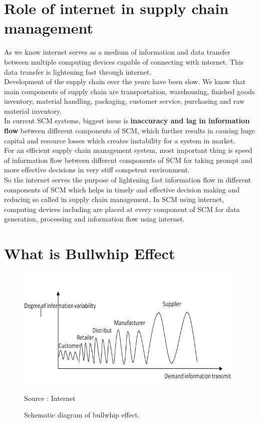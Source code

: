 \documentclass[12pt, a4paper]{report}
\begin{document}
\section{Role of internet in supply chain management}
As we know internet serves as a medium of information and data transfer between multiple computing devices capable of connecting with internet. This data transfer is lightening fast through internet.\\
Development of the supply chain over the years have been slow. We know that main components of supply chain are transportation, warehousing, finished goods inventory, material handling, packaging, customer service, purchasing and raw material inventory.\\
In current SCM systems, biggest issue is \textbf{inaccuracy and lag in information flow} between different components of SCM, which further results in  causing huge capital and resource losses which creates instability for a system in market.\\
For an efficient supply chain management system, most important thing is speed of information flow between different components of SCM for taking prompt and more effective decisions in very stiff competent environment.\\
So the internet serves the purpose of lightening fast information flow in different components of SCM which helps in timely and effective decision making and reducing so called  in supply chain management. In SCM using internet, computing devices including  are placed at every component of SCM for data generation, processing and information flow using internet.\cite{lancioni2000role}
\section{What is Bullwhip Effect}
\begin{figure}[h]
\centering
\includegraphics[width=11cm]{bullwhip}
\caption{Schematic diagram of bullwhip effect.}{Source : Internet}
\label{figure-1}
\end{figure}
\end{document}
